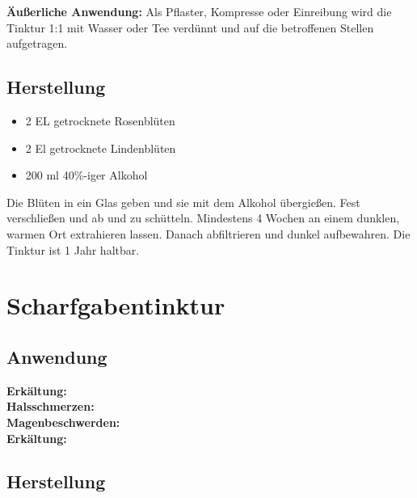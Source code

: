 \textbf{Äußerliche Anwendung:} Als Pflaster, Kompresse oder Einreibung wird die Tinktur 1:1 mit Wasser oder Tee verdünnt und auf die betroffenen Stellen aufgetragen.\\

\subsection{Herstellung}

\begin{itemize}
	\item 2 EL getrocknete Rosenblüten
	\item 2 El getrocknete Lindenblüten
	\item 200 ml 40\%-iger Alkohol
\end{itemize}

Die Blüten in ein Glas geben und sie mit dem Alkohol übergießen. Fest verschließen und ab und zu schütteln. Mindestens 4 Wochen an einem dunklen, warmen Ort extrahieren lassen. Danach abfiltrieren und dunkel aufbewahren. Die Tinktur ist 1 Jahr haltbar.




\newpage



\section{Scharfgabentinktur}


   

\subsection{Anwendung}
\textbf{Erkältung:} \\ 

\textbf{Halsschmerzen:} \\ 

\textbf{Magenbeschwerden:} \\ 

\textbf{Erkältung:} \\ 

\subsection{Herstellung}

